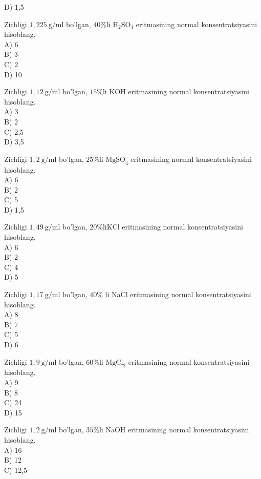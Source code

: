 D) 1,5
  \item Zichligi $1,225 \mathrm{~g} / \mathrm{ml}$ bo'lgan, $40 \% \mathrm{li}$ $\mathrm{H}_{2} \mathrm{SO}_{4}$ eritmasining normal konsentratsiyasini hisoblang.\\
A) 6\\
B) 3\\
C) 2\\
D) 10
  \item Zichligi $1,12 \mathrm{~g} / \mathrm{ml}$ bo'lgan, $15 \% \mathrm{li}$ KOH eritmasining normal konsentratsiyasini hisoblang.\\
A) 3\\
B) 2\\
C) 2,5\\
D) 3,5
  \item Zichligi $1,2 \mathrm{~g} / \mathrm{ml}$ bo'lgan, $25 \% \mathrm{li}$ $\mathrm{MgSO}_{4}$ eritmasining normal konsentratsiyasini hisoblang.\\
A) 6\\
B) 2\\
C) 5\\
D) 1,5
  \item Zichligi $1,49 \mathrm{~g} / \mathrm{ml}$ bo'lgan, $20 \% \mathrm{li} \mathrm{KCl}$ eritmasining normal konsentratsiyasini hisoblang.\\
A) 6\\
B) 2\\
C) 4\\
D) 5
  \item Zichligi $1,17 \mathrm{~g} / \mathrm{ml}$ bo'lgan, $40 \%$ li NaCl eritmasining normal konsentratsiyasini hisoblang.\\
A) 8\\
B) 7\\
C) 5\\
D) 6
  \item Zichligi $1,9 \mathrm{~g} / \mathrm{ml}$ bo'lgan, $60 \% \mathrm{li}$ $\mathrm{MgCl}_{2}$ eritmasining normal konsentratsiyasini hisoblang.\\
A) 9\\
B) 8\\
C) 24\\
D) 15
  \item Zichligi $1,2 \mathrm{~g} / \mathrm{ml}$ bo'lgan, $35 \% \mathrm{li}$ NaOH eritmasining normal konsentratsiyasini hisoblang.\\
A) 16\\
B) 12\\
C) 12,5\\
